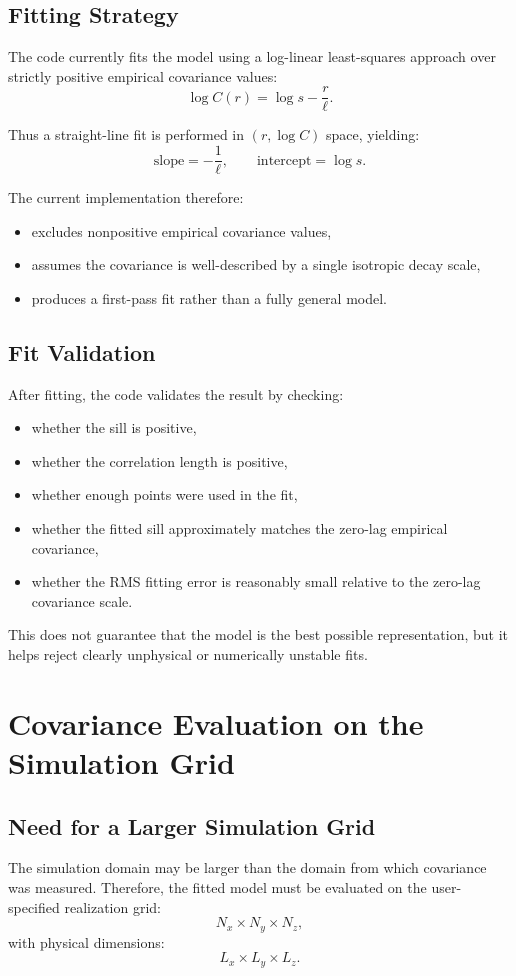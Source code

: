 \documentclass[11pt]{article}
\begin{document}
\subsection{Fitting Strategy}
The code currently fits the model using a log-linear least-squares approach over
strictly positive empirical covariance values:
\[
\log C(r) = \log s - \frac{r}{\ell}.
\]

Thus a straight-line fit is performed in \((r,\log C)\) space, yielding:
\[
\text{slope} = -\frac{1}{\ell},
\qquad
\text{intercept} = \log s.
\]

The current implementation therefore:
\begin{itemize}
\item excludes nonpositive empirical covariance values,
\item assumes the covariance is well-described by a single isotropic decay scale,
\item produces a first-pass fit rather than a fully general model.
\end{itemize}

\subsection{Fit Validation}
After fitting, the code validates the result by checking:
\begin{itemize}
\item whether the sill is positive,
\item whether the correlation length is positive,
\item whether enough points were used in the fit,
\item whether the fitted sill approximately matches the zero-lag empirical
covariance,
\item whether the RMS fitting error is reasonably small relative to the
zero-lag covariance scale.
\end{itemize}

This does not guarantee that the model is the best possible representation, but
it helps reject clearly unphysical or numerically unstable fits.

\section{Covariance Evaluation on the Simulation Grid}
\subsection{Need for a Larger Simulation Grid}
The simulation domain may be larger than the domain from which covariance was
measured. Therefore, the fitted model must be evaluated on the user-specified
realization grid:
\[
N_x \times N_y \times N_z,
\]
with physical dimensions:
\[
L_x \times L_y \times L_z.
\]
\end{document}
